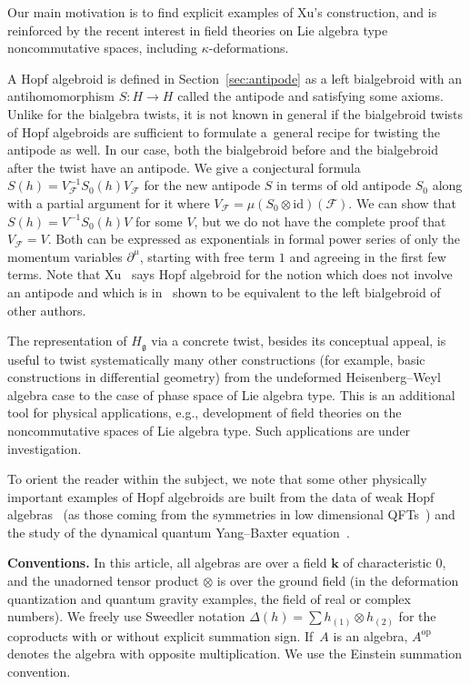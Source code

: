 \documentclass[10pt,a4paper]{amsart}
\def\op{\mathrm{op}}
\def\genfd{\mathbf{k}}
\def\gg{\mathfrak{g}}
\def\id{\mathrm{id}}
\numberwithin{equation}{section}
\begin{document}
Our main motivation is to find explicit examples of Xu's construction, and is reinforced by the recent interest in field theories on Lie algebra type noncommutative spaces, including $\kappa$-deformations.

A Hopf algebroid is defined in Section~\ref{sec:antipode} as a left bialgebroid with an antihomomorphism $S\colon H\to H$ called the antipode and satisfying some axioms. Unlike for the bialgebra twists, it is not known in general if the bialgebroid twists of Hopf algebroids are sufficient to formulate a~general recipe for twisting the antipode as well. In our case, both the bialgebroid before and the bialgebroid after the twist have an antipode. We give a conjectural formula $S(h) = V_{\mathcal{F}}^{-1}S_0(h)V_{\mathcal{F}}$ for the new antipode $S$ in terms of old antipode $S_0$ along with a partial argument for it where $V_{\mathcal{F}} = \mu(S_0\otimes\id)(\mathcal{F})$. We can show that $S(h) = V^{-1}S_0(h)V$ for some $V$, but we do not have the complete proof that $V_{\mathcal{F}} = V$. Both can be expressed as exponentials in formal power series of only the momentum variables $\partial^\mu$, starting with free term $1$ and agreeing in the first few terms. Note that Xu~\cite{xu} says Hopf algebroid for the notion
which does not involve an antipode and which is in~\cite{BrzMilitaru} shown to be equivalent to the left bialgebroid of other authors.

The representation of $H_\gg$ via a concrete twist, besides its conceptual appeal, is useful to twist systematically many other constructions (for example, basic constructions in differential geometry) from the undeformed Heisenberg--Weyl algebra case to the case of phase space of Lie algebra type. This is an additional tool for physical applications, e.g., development of field theories on the noncommutative spaces of Lie algebra type. Such applications are under investigation.

To orient the reader within the subject, we note that some other physically important examples of Hopf algebroids are built from the data of weak Hopf algebras~\cite{bohmHbk} (as those coming from the symmetries in low dimensional QFTs~\cite{mackschomerus}) and the study of the
dynamical quantum Yang--Baxter equation~\cite{doninmudrov,xu}.

{\bf Conventions.} In this article, all algebras are over a field $\genfd$ of characteristic $0$, and the unadorned tensor product $\otimes$ is over the ground field (in the deformation quantization and quantum gravity examples, the field of real or complex numbers). We freely use Sweedler
notation $\Delta(h) = \sum h_{(1)}\otimes h_{(2)}$ for the coproducts with or without explicit summation sign. If~$A$ is an algebra, $A^\op$ denotes the algebra with opposite multiplication. We use the Einstein summation convention.
\end{document}
